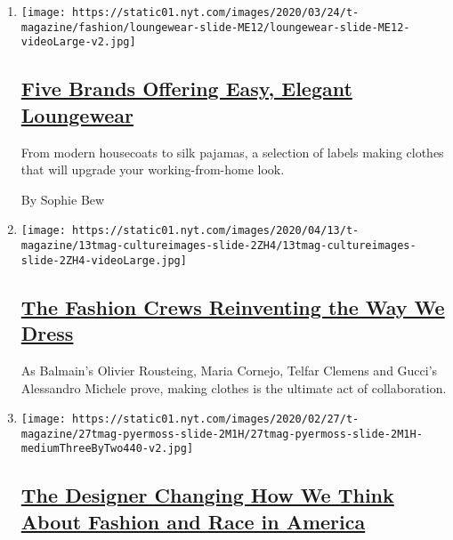 \begin{enumerate}
\def\labelenumi{\arabic{enumi}.}
\item
  \texttt{[image: https://static01.nyt.com/images/2020/03/24/t-magazine/fashion/loungewear-slide-ME12/loungewear-slide-ME12-videoLarge-v2.jpg]}

  \hypertarget{five-brands-offering-easy-elegant-loungewear}{%
  \subsection{\texorpdfstring{\href{/2020/03/26/t-magazine/work-from-home-clothing-lounge-wear.html}{Five
  Brands Offering Easy, Elegant
  Loungewear}}{Five Brands Offering Easy, Elegant Loungewear}}\label{five-brands-offering-easy-elegant-loungewear}}

  From modern housecoats to silk pajamas, a selection of labels making
  clothes that will upgrade your working-from-home look.

  By Sophie Bew
\item
  \texttt{[image: https://static01.nyt.com/images/2020/04/13/t-magazine/13tmag-cultureimages-slide-2ZH4/13tmag-cultureimages-slide-2ZH4-videoLarge.jpg]}

  \hypertarget{the-fashion-crews-reinventing-the-way-we-dress}{%
  \subsection{\texorpdfstring{\href{/interactive/2020/04/13/t-magazine/maria-cornejo-olivier-rousteing-telfar-clemens-alessandro-michele.html}{The
  Fashion Crews Reinventing the Way We
  Dress}}{The Fashion Crews Reinventing the Way We Dress}}\label{the-fashion-crews-reinventing-the-way-we-dress}}

  As Balmain's Olivier Rousteing, Maria Cornejo, Telfar Clemens and
  Gucci's Alessandro Michele prove, making clothes is the ultimate act
  of collaboration.
\item
  \texttt{[image: https://static01.nyt.com/images/2020/02/27/t-magazine/27tmag-pyermoss-slide-2M1H/27tmag-pyermoss-slide-2M1H-mediumThreeByTwo440-v2.jpg]}

  \hypertarget{the-designer-changing-how-we-think-about-fashion-and-race-in-america}{%
  \subsection{\texorpdfstring{\href{/2020/03/05/t-magazine/pyer-moss-kerby-jean-raymond.html}{The
  Designer Changing How We Think About Fashion and Race in
  America}}{The Designer Changing How We Think About Fashion and Race in America}}\label{the-designer-changing-how-we-think-about-fashion-and-race-in-america}}


\end{enumerate}
